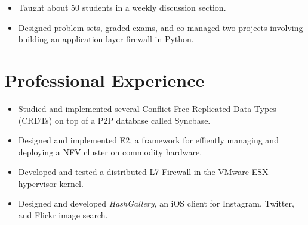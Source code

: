 \documentclass[11pt,letterpaper,sans]{moderncv}
\begin{document}
 {
\begin{itemize}
\item Taught about 50 students in a weekly discussion section.
\item Designed problem sets, graded exams, and co-managed two projects involving
building an application-layer firewall in Python.
\end{itemize}
}

\section{Professional Experience}

 {
\begin{itemize}
\item Studied and implemented several Conflict-Free Replicated Data Types
(CRDTs) on top of a P2P database called Syncbase.
\end{itemize}
}

 {
\begin{itemize}
\item Designed and implemented E2, a framework for effiently managing and deploying a NFV cluster
on commodity hardware.
\end{itemize}
}

 {
\begin{itemize}
\item Developed and tested a distributed L7 Firewall in the VMware
ESX hypervisor kernel.
\end{itemize}
}


 {
\begin{itemize} 
\item Designed and developed \emph{HashGallery}, an iOS client for Instagram,
Twitter, and Flickr image search.
\end{itemize}
}
\end{document}
